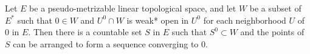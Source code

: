 Let $E$ be a pseudo-metrizable linear topological space, and let $W$ be a subset of $E^*$ such that $0 \in W$ and $U^0 \cap W$ is weak* open in $U^0$ for each neighborhood $U$ of $0$ in $E$. Then there is a countable set $S$ in $E$ such that $S^0 \subset W$ and the points of $S$ can be arranged to form a sequence converging to $0$.
